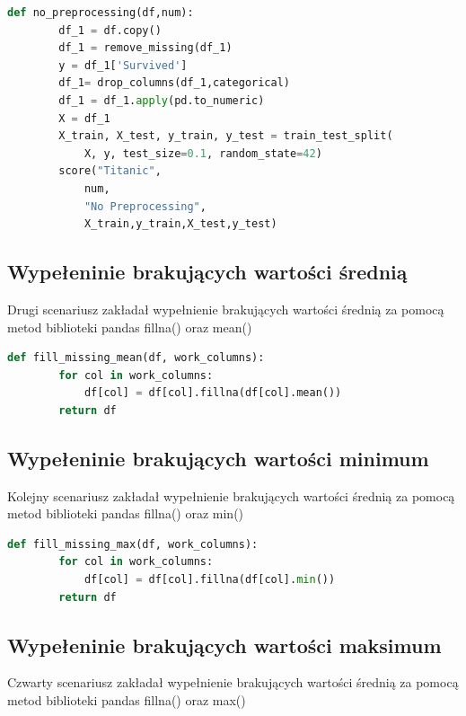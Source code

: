\documentclass{article}
\begin{document}
\begin{lstlisting}[language=Python, caption={Brak przygotowania danych dla zbioru danych Titanic}, captionpos=b]
    def no_preprocessing(df,num):
        df_1 = df.copy()
        df_1 = remove_missing(df_1)
        y = df_1['Survived']
        df_1= drop_columns(df_1,categorical)
        df_1 = df_1.apply(pd.to_numeric)
        X = df_1
        X_train, X_test, y_train, y_test = train_test_split(
            X, y, test_size=0.1, random_state=42)
        score("Titanic",
            num,
            "No Preprocessing",
            X_train,y_train,X_test,y_test)
    \end{lstlisting}

\subsection{Wypełeninie brakujących wartości średnią}
Drugi scenariusz zakładał wypełnienie brakujących 
wartości średnią za pomocą metod biblioteki pandas 
fillna() oraz mean()

\begin{lstlisting}[language=Python, caption={Wypełnienie brakujących wartości średnią}, captionpos=b]
    def fill_missing_mean(df, work_columns):
        for col in work_columns:
            df[col] = df[col].fillna(df[col].mean())
        return df
\end{lstlisting}

\subsection{Wypełeninie brakujących wartości minimum}
Kolejny scenariusz zakładał wypełnienie brakujących 
wartości średnią za pomocą metod biblioteki pandas fillna() 
oraz min()

\begin{lstlisting}[language=Python, caption={Wypełnienie brakujących wartości minimum}, captionpos=b]
    def fill_missing_max(df, work_columns):
        for col in work_columns:
            df[col] = df[col].fillna(df[col].min())
        return df
\end{lstlisting}

\subsection{Wypełeninie brakujących wartości maksimum}
Czwarty scenariusz zakładał wypełnienie brakujących 
wartości średnią za pomocą metod biblioteki pandas 
fillna() oraz max()
\end{document}
